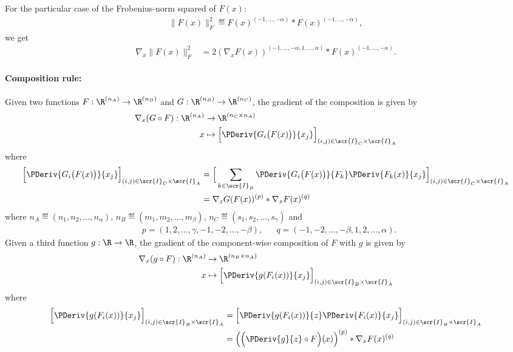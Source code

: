 \documentclass[11pt]{article}
\theoremstyle{remark}
\begin{document}
\medskip

For the particular case of the Frobenius-norm squared of $F(x)$:
\begin{align*}
  \| F(x) \|_F^2\eqdef F(x)^{(-1,\dots,-\alpha)} * F(x)^{(-1,\dots,-\alpha)},
\end{align*}
we get
\begin{align*}
  \nabla_x \|F(x)\|_F^2 &=2 (\nabla_xF(x))^{(-1,\dots,-\alpha,1,\dots,\alpha)} * F(x)^{(-1,\dots,-\alpha)}.
\end{align*}



\paragraph{Composition rule:} Given two functions
$F:\R^{(n_A)}\to\R^{(n_B)}$ and
$G:\R^{(n_B)}\to\R^{(n_C)}$, the gradient of the
composition is given by
\begin{align*}
  \nabla_x (G \circ F):\R^{(n_A)}&\to\R^{(n_C\times n_A)}\\
  x&\mapsto \Big[\PDeriv{G_i\big(F(x)\big)}{x_j}\Big]_{(i,j)\in\scr{I}_C\times\scr{I}_A}
\end{align*}
where
\begin{align*}
  \Big[\PDeriv{G_i\big(F(x)\big)}{x_j}\Big]_{(i,j)\in\scr{I}_C\times\scr{I}_A}
  &= \Big[\sum_{k\in\scr{I}_B}\PDeriv{G_i\big(F(x)\big)}{F_k}\PDeriv{F_k(x)}{x_j}\Big]_{(i,j)\in\scr{I}_C\times\scr{I}_A}\\
  &= \nabla_z G(F(x))^{(p)} * \nabla_x F(x)^{(q)} 
\end{align*}
where $n_A\eqdef(n_1,n_2,\dots,n_\alpha)$, $n_B\eqdef(m_1,m_2,\dots,m_\beta)$,
$n_C\eqdef(s_1,s_2,\dots,s_\gamma)$ and
\begin{align*}
  &p=(1,2,\dots,\gamma,-1,-2,\dots,-\beta), &
  &q=(-1,-2,\dots,-\beta,1,2,\dots,\alpha).
\end{align*}
Given a third function $g:\R\to\R$, the gradient of the component-wise
composition of $F$ with $g$ is given by
\begin{align*}
  \nabla_x (g\circ F):\R^{(n_A)}&\to\R^{(n_B\times n_A)}\\
  x&\mapsto \Big[\PDeriv{g(F_i(x))}{x_j}\Big]_{(i,j)\in\scr{I}_B\times\scr{I}_A}
\end{align*}
where
\begin{align*}
  \Big[\PDeriv{g(F_i(x))}{x_j}\Big]_{(i,j)\in\scr{I}_B\times\scr{I}_A}
  &= \Big[\PDeriv{g(F_i(x))}{z}\PDeriv{F_i(x)}{x_j}\Big]_{(i,j)\in\scr{I}_B\times\scr{I}_A}\\
  &= \Big(\Big(\PDeriv{g}{z} \circ F\Big)(x)\Big)^{(p)} * \nabla_x F(x)^{(q)} 
\end{align*}
\end{document}
